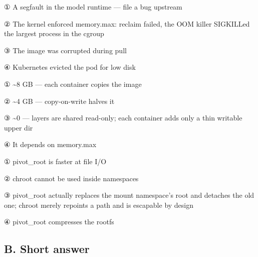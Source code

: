 
\begin{tbboptions}
  \item ① A segfault in the model runtime — file a bug upstream
  \item ② The kernel enforced memory.max: reclaim failed, the OOM killer SIGKILLed the largest process in the cgroup
  \item ③ The image was corrupted during pull
  \item ④ Kubernetes evicted the pod for low disk
\end{tbboptions}


\begin{tbboptions}
  \item ① \textasciitilde{}8 GB — each container copies the image
  \item ② \textasciitilde{}4 GB — copy-on-write halves it
  \item ③ \textasciitilde{}0 — layers are shared read-only; each container adds only a thin writable upper dir
  \item ④ It depends on memory.max
\end{tbboptions}


\begin{tbboptions}
  \item ① pivot\_root is faster at file I/O
  \item ② chroot cannot be used inside namespaces
  \item ③ pivot\_root actually replaces the mount namespace's root and detaches the old one; chroot merely repoints a path and is escapable by design
  \item ④ pivot\_root compresses the rootfs
\end{tbboptions}

\subsection*{B. Short answer}


